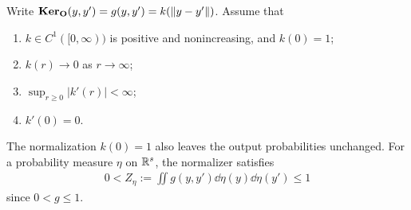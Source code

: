 \begin{condition}\label{output_kernel_conditions}
Write $\mathbf{Ker}_{\mathbf{O}}(y,y')=g(y,y')=k(\left\lVert y-y'\right\rVert)$. Assume that
\begin{enumerate}[label=(\arabic*),nosep]
\item $k\in C^1([0,\infty))$ is positive and nonincreasing, and $k(0)=1$;
\item $k(r)\to0$ as $r\to\infty$;
\item $\sup_{r\geq0}|k'(r)|<\infty$;
\item $k'(0)=0$.
\end{enumerate}
\end{condition}
The normalization $k(0)=1$ also leaves the output probabilities unchanged. For a probability measure $\eta$ on $\mathbb{R}^s$, the normalizer satisfies
\begin{align}\label{eq:positive-normalizer}
0<Z_\eta:=\iint g(y,y')\dd\eta(y)\dd\eta(y')\leq1
\end{align}
since $0<g\leq1$.


